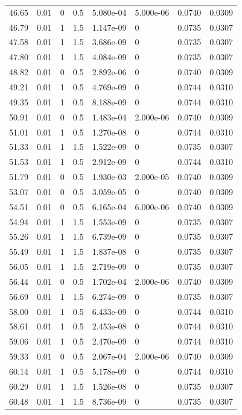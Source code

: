 \documentclass[preview]{standalone}
\begin{document}
{{{\begin{tabular}{L{1.2cm}C{1.2cm} C{0.3cm}C{0.5cm} C{1.4cm}C{1.4cm} C{1.4cm}C{1.4cm}}
  46.65  &  0.01  & 0     & 0.5 &  5.080e-04  & 5.000e-06  & 0.0740 &  0.0309   \\ 
  46.79  &  0.01  & 1     & 1.5 &  1.147e-09  & 0  & 0.0735 &  0.0307   \\ 
  47.58  &  0.01  & 1     & 1.5 &  3.686e-09  & 0  & 0.0735 &  0.0307   \\ 
  47.80  &  0.01  & 1     & 1.5 &  4.084e-09  & 0  & 0.0735 &  0.0307   \\ 
  48.82  &  0.01  & 0     & 0.5 &  2.892e-06  & 0  & 0.0740 &  0.0309   \\ 
  49.21  &  0.01  & 1     & 0.5 &  4.769e-09  & 0  & 0.0744 &  0.0310   \\ 
  49.35  &  0.01  & 1     & 0.5 &  8.188e-09  & 0  & 0.0744 &  0.0310   \\ 
  50.91  &  0.01  & 0     & 0.5 &  1.483e-04  & 2.000e-06  & 0.0740 &  0.0309   \\ 
  51.01  &  0.01  & 1     & 0.5 &  1.270e-08  & 0  & 0.0744 &  0.0310   \\ 
  51.33  &  0.01  & 1     & 1.5 &  1.522e-09  & 0  & 0.0735 &  0.0307   \\ 
  51.53  &  0.01  & 1     & 0.5 &  2.912e-09  & 0  & 0.0744 &  0.0310   \\ 
  51.79  &  0.01  & 0     & 0.5 &  1.930e-03  & 2.000e-05  & 0.0740 &  0.0309   \\ 
  53.07  &  0.01  & 0     & 0.5 &  3.059e-05  & 0  & 0.0740 &  0.0309   \\ 
  54.51  &  0.01  & 0     & 0.5 &  6.165e-04  & 6.000e-06  & 0.0740 &  0.0309   \\ 
  54.94  &  0.01  & 1     & 1.5 &  1.553e-09  & 0  & 0.0735 &  0.0307   \\ 
  55.26  &  0.01  & 1     & 1.5 &  6.739e-09  & 0  & 0.0735 &  0.0307   \\ 
  55.49  &  0.01  & 1     & 1.5 &  1.837e-08  & 0  & 0.0735 &  0.0307   \\ 
  56.05  &  0.01  & 1     & 1.5 &  2.719e-09  & 0  & 0.0735 &  0.0307   \\ 
  56.44  &  0.01  & 0     & 0.5 &  1.702e-04  & 2.000e-06  & 0.0740 &  0.0309   \\ 
  56.69  &  0.01  & 1     & 1.5 &  6.274e-09  & 0  & 0.0735 &  0.0307   \\ 
  58.00  &  0.01  & 1     & 0.5 &  6.433e-09  & 0  & 0.0744 &  0.0310   \\ 
  58.61  &  0.01  & 1     & 0.5 &  2.453e-08  & 0  & 0.0744 &  0.0310   \\ 
  59.06  &  0.01  & 1     & 0.5 &  2.470e-09  & 0  & 0.0744 &  0.0310   \\ 
  59.33  &  0.01  & 0     & 0.5 &  2.067e-04  & 2.000e-06  & 0.0740 &  0.0309   \\ 
  60.14  &  0.01  & 1     & 0.5 &  5.178e-09  & 0  & 0.0744 &  0.0310   \\ 
  60.29  &  0.01  & 1     & 1.5 &  1.526e-08  & 0  & 0.0735 &  0.0307   \\ 
  60.48  &  0.01  & 1     & 1.5 &  8.736e-09  & 0  & 0.0735 &  0.0307   \\ 
\hline 
\end{tabular} 

}}}
\end{document}
